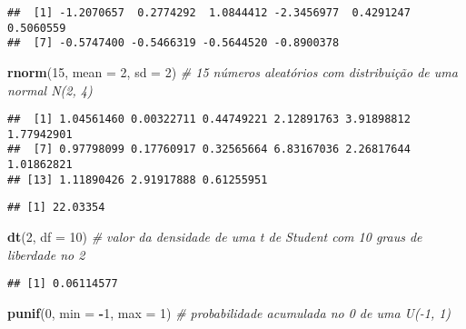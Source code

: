 \documentclass[]{article}
\newenvironment{Shaded}{\begin{snugshade}}{\end{snugshade}}
\newcommand{\KeywordTok}[1]{\textcolor[rgb]{0.13,0.29,0.53}{\textbf{#1}}}
\newcommand{\DataTypeTok}[1]{\textcolor[rgb]{0.13,0.29,0.53}{#1}}
\newcommand{\DecValTok}[1]{\textcolor[rgb]{0.00,0.00,0.81}{#1}}
\newcommand{\FloatTok}[1]{\textcolor[rgb]{0.00,0.00,0.81}{#1}}
\newcommand{\CommentTok}[1]{\textcolor[rgb]{0.56,0.35,0.01}{\textit{#1}}}
\newcommand{\OperatorTok}[1]{\textcolor[rgb]{0.81,0.36,0.00}{\textbf{#1}}}
\newcommand{\NormalTok}[1]{#1}
\begin{document}
\begin{verbatim}
##  [1] -1.2070657  0.2774292  1.0844412 -2.3456977  0.4291247  0.5060559
##  [7] -0.5747400 -0.5466319 -0.5644520 -0.8900378
\end{verbatim}

\begin{Shaded}
\begin{Highlighting}[]
\KeywordTok{rnorm}\NormalTok{(}\DecValTok{15}\NormalTok{, }\DataTypeTok{mean =} \DecValTok{2}\NormalTok{, }\DataTypeTok{sd =} \DecValTok{2}\NormalTok{) }\CommentTok{# 15 números aleatórios com distribuição de uma normal N(2, 4)}
\end{Highlighting}
\end{Shaded}

\begin{verbatim}
##  [1] 1.04561460 0.00322711 0.44749221 2.12891763 3.91898812 1.77942901
##  [7] 0.97798099 0.17760917 0.32565664 6.83167036 2.26817644 1.01862821
## [13] 1.11890426 2.91917888 0.61255951
\end{verbatim}

\begin{Shaded}
\end{Shaded}

\begin{verbatim}
## [1] 22.03354
\end{verbatim}

\begin{Shaded}
\begin{Highlighting}[]
\KeywordTok{dt}\NormalTok{(}\DecValTok{2}\NormalTok{, }\DataTypeTok{df =} \DecValTok{10}\NormalTok{) }\CommentTok{# valor da densidade de uma t de Student com 10 graus de liberdade no 2}
\end{Highlighting}
\end{Shaded}

\begin{verbatim}
## [1] 0.06114577
\end{verbatim}

\begin{Shaded}
\begin{Highlighting}[]
\KeywordTok{punif}\NormalTok{(}\DecValTok{0}\NormalTok{, }\DataTypeTok{min =} \OperatorTok{-}\DecValTok{1}\NormalTok{, }\DataTypeTok{max =} \DecValTok{1}\NormalTok{) }\CommentTok{# probabilidade acumulada no 0 de uma U(-1, 1)}
\end{Highlighting}
\end{Shaded}
\end{document}
